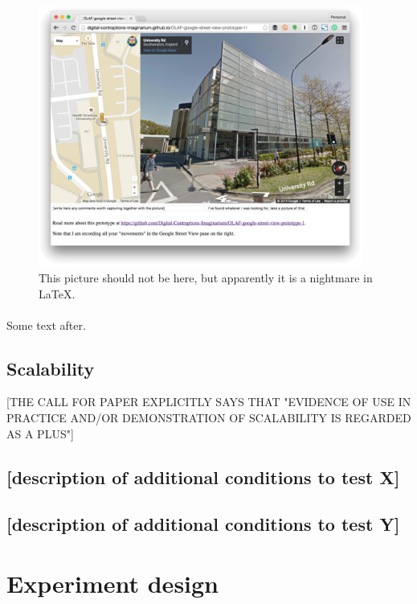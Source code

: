 \documentclass{llncs}
\begin{document}
{\begin{figure}
	\includegraphics[width=0.95\textwidth]{some_picture.png}
	\caption{This picture should not be here, but apparently it is a nightmare in LaTeX.}
	\label{fig:some_figure}
\end{figure}

\paragraph{}

Some text after.
	
\subsection{Scalability}

[THE CALL FOR PAPER EXPLICITLY SAYS THAT "EVIDENCE OF USE IN PRACTICE AND/OR DEMONSTRATION OF SCALABILITY IS REGARDED AS A PLUS"]

\subsection{{[}description of additional conditions to test X{]}}
\subsection{{[}description of additional conditions to test Y{]}}

\section{Experiment design}

}
\end{document}
